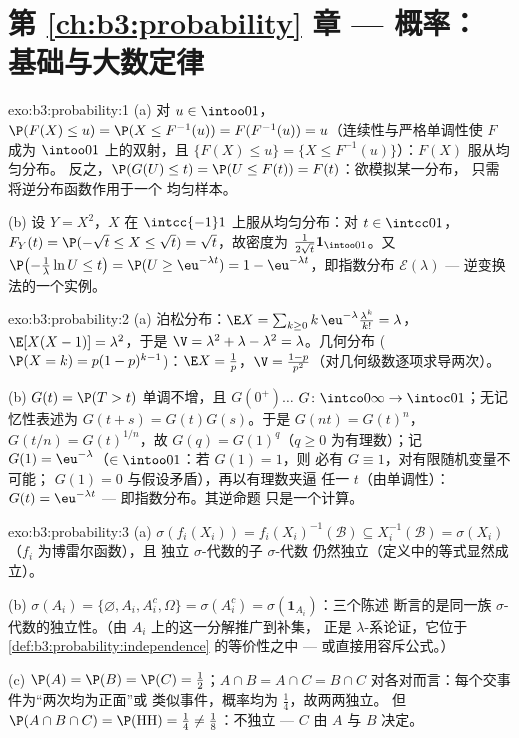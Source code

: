 \section*{第 \ref{ch:b3:probability} 章 --- 概率：
基础与大数定律}

\begin{solution}{exo:b3:probability:1}
(a) 对 $u \in \intoo01$，$\P(F(X) \leq u) = \P(X \leq
F^{-1}(u)) = F(F^{-1}(u)) = u$（连续性与严格单调性使 $F$
成为 $\intoo01$ 上的双射，且
$\{F(X) \leq u\} = \{X \leq F^{-1}(u)\}$）：$F(X)$ 服从均匀分布。
反之，$\P(G(U) \leq t) = \P(U \leq F(t)) = F(t)$：欲模拟某一分布，
只需将逆分布函数作用于一个
均匀样本。

(b) 设 $Y = X^2$，$X$ 在 $\intcc{-1}1$ 上服从均匀分布：对 $t \in
\intcc01$，$F_Y(t) = \P(-\sqrt t \leq X \leq \sqrt t) = \sqrt
t$，故密度为 $\frac1{2\sqrt t}\mathbf 1_{\intoo01}$。又
$\P\bigl(-\frac1\lambda\ln U \leq t\bigr) = \P(U \geq
\eu^{-\lambda t}) = 1 - \eu^{-\lambda t}$，即指数分布
$\mathcal E(\lambda)$ --- 逆变换法的一个实例。
\end{solution}

\begin{solution}{exo:b3:probability:2}
(a) 泊松分布：$\E X = \sum_{k\geq0}k\,\eu^{-\lambda}
\frac{\lambda^k}{k!} = \lambda$，$\E[X(X-1)] = \lambda^2$，于是
$\V = \lambda^2 + \lambda - \lambda^2 = \lambda$。几何分布
($\P(X = k) = p(1-p)^{k-1}$)：$\E X = \frac1p$，$\V =
\frac{1-p}{p^2}$（对几何级数逐项求导两次）。

(b) $G(t) = \P(T > t)$ 单调不增，且 $G(0^+)\dots$
$G \colon \intco0\infty \to \intoc01$；无记忆性表述为
$G(t + s) = G(t)G(s)$。于是 $G(n t) = G(t)^n$，$G(t/n) =
G(t)^{1/n}$，故 $G(q) = G(1)^q$（$q \geq 0$ 为有理数）；记
$G(1) = \eu^{-\lambda}$（$\in \intoo01$：若 $G(1) = 1$，则
必有 $G \equiv 1$，对有限随机变量不可能；
$G(1) = 0$ 与假设矛盾），再以有理数夹逼
任一 $t$（由单调性）：$G(t) =
\eu^{-\lambda t}$ --- 即指数分布。其逆命题
只是一个计算。
\end{solution}

\begin{solution}{exo:b3:probability:3}
(a) $\sigma(f_i(X_i)) = f_i(X_i)^{-1}(\mathcal B) \subseteq
X_i^{-1}(\mathcal B) = \sigma(X_i)$（$f_i$ 为博雷尔函数），且
独立 $\sigma$-代数的子 $\sigma$-代数
仍然独立（定义中的等式显然成立）。

(b) $\sigma(A_i) = \{\varnothing, A_i, A_i^c, \Omega\} =
\sigma(A_i^c) = \sigma(\mathbf 1_{A_i})$：三个陈述
断言的是同一族
$\sigma$-代数的独立性。（由 $A_i$ 上的这一分解推广到补集，
正是 $\lambda$-系论证，它位于
\cref{def:b3:probability:independence} 的等价性之中
--- 或直接用容斥公式。）

(c) $\P(A) = \P(B) = \P(C) = \frac12$；$A\cap B = A\cap C =
B\cap C$ 对各对而言：每个交事件为“两次均为正面”或
类似事件，概率均为 $\frac14$，故两两独立。
但 $\P(A\cap B\cap C) = \P(\text{HH}) = \frac14 \neq
\frac18$：不独立 --- $C$ 由 $A$ 与
$B$ 决定。
\end{solution}

